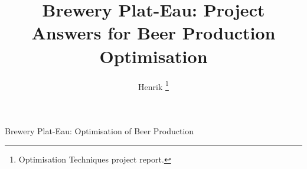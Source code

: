 \documentclass[journal]{IEEEtran}
\begin{document}
\title{Brewery Plat-Eau: Project Answers for Beer Production Optimisation}

\author{Henrik%
\thanks{Optimisation Techniques project report.}}

%
{Brewery Plat-Eau: Optimisation of Beer Production}

\maketitle














\nocite{assignment,scipy}


\end{document}
